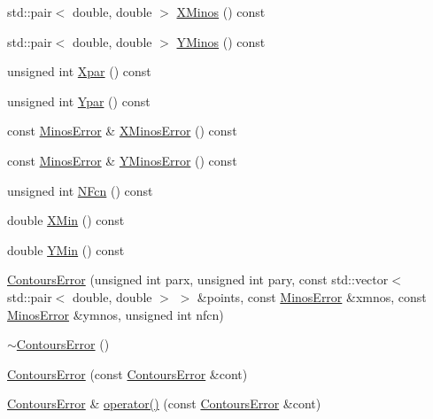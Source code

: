 \begin{DoxyCompactItemize}
\item 
std\+::pair$<$ double, double $>$ \mbox{\hyperlink{classROOT_1_1Minuit2_1_1ContoursError_afd1906c6e1b9ddd74363df072590183f}{X\+Minos}} () const
\item 
std\+::pair$<$ double, double $>$ \mbox{\hyperlink{classROOT_1_1Minuit2_1_1ContoursError_a181d8326a32d95dd0f619bcb63076c00}{Y\+Minos}} () const
\item 
unsigned int \mbox{\hyperlink{classROOT_1_1Minuit2_1_1ContoursError_a4f04b22b326b30c5a1bf3c0435544e8d}{Xpar}} () const
\item 
unsigned int \mbox{\hyperlink{classROOT_1_1Minuit2_1_1ContoursError_a3d118d7b9c49e6835130e0ce50b94b18}{Ypar}} () const
\item 
const \mbox{\hyperlink{classROOT_1_1Minuit2_1_1MinosError}{Minos\+Error}} \& \mbox{\hyperlink{classROOT_1_1Minuit2_1_1ContoursError_a0d14fdab181f06ddd1b38e7dc763718b}{X\+Minos\+Error}} () const
\item 
const \mbox{\hyperlink{classROOT_1_1Minuit2_1_1MinosError}{Minos\+Error}} \& \mbox{\hyperlink{classROOT_1_1Minuit2_1_1ContoursError_a7ca7b0f224597473592c8da5a5825d61}{Y\+Minos\+Error}} () const
\item 
unsigned int \mbox{\hyperlink{classROOT_1_1Minuit2_1_1ContoursError_a1342abcb15690e6897ad860e7f05026d}{N\+Fcn}} () const
\item 
double \mbox{\hyperlink{classROOT_1_1Minuit2_1_1ContoursError_ac0dbac1ec08765a632908c88c5f24822}{X\+Min}} () const
\item 
double \mbox{\hyperlink{classROOT_1_1Minuit2_1_1ContoursError_ac2bd4c328fe62d04b2809d9e0730efe3}{Y\+Min}} () const
\item 
\mbox{\hyperlink{classROOT_1_1Minuit2_1_1ContoursError_abe494ac0098e41bf38fd4023e018e340}{Contours\+Error}} (unsigned int parx, unsigned int pary, const std\+::vector$<$ std\+::pair$<$ double, double $>$ $>$ \&points, const \mbox{\hyperlink{classROOT_1_1Minuit2_1_1MinosError}{Minos\+Error}} \&xmnos, const \mbox{\hyperlink{classROOT_1_1Minuit2_1_1MinosError}{Minos\+Error}} \&ymnos, unsigned int nfcn)
\item 
\mbox{\hyperlink{classROOT_1_1Minuit2_1_1ContoursError_a712a4699d5a022af68106524be05d862}{$\sim$\+Contours\+Error}} ()
\item 
\mbox{\hyperlink{classROOT_1_1Minuit2_1_1ContoursError_a270e1882e03ca939a8a910f9c6f3cbeb}{Contours\+Error}} (const \mbox{\hyperlink{classROOT_1_1Minuit2_1_1ContoursError}{Contours\+Error}} \&cont)
\item 
\mbox{\hyperlink{classROOT_1_1Minuit2_1_1ContoursError}{Contours\+Error}} \& \mbox{\hyperlink{classROOT_1_1Minuit2_1_1ContoursError_a17f1d0a4579d605cd25da8e0e27bf4ba}{operator()}} (const \mbox{\hyperlink{classROOT_1_1Minuit2_1_1ContoursError}{Contours\+Error}} \&cont)

\end{DoxyCompactItemize}
